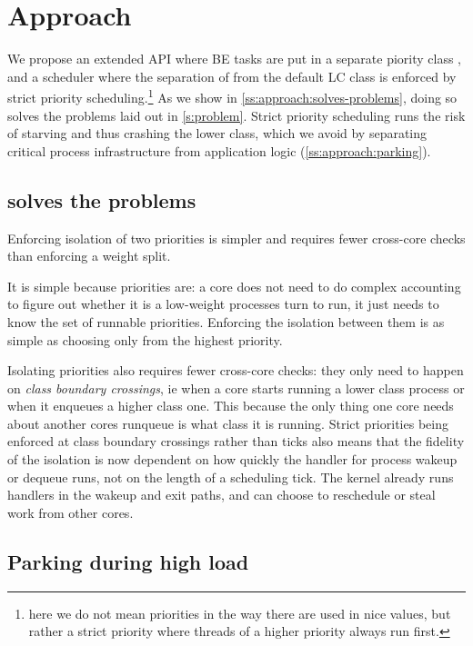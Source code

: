\section{Approach}\label{s:approach}

We propose an extended \cgroups{} API where BE tasks are put in a separate
piority class \beclass{}, and a scheduler where the separation of \beclass{}
from the default LC class is enforced by strict priority
scheduling.\footnote{here we do not mean priorities in the way there are used in
nice values, but rather a strict priority where threads of a higher priority
always run first.} As we show in \autoref{ss:approach:solves-problems}, doing so
solves the problems laid out in \autoref{s:problem}. Strict priority scheduling
runs the risk of starving and thus crashing the lower class, which we avoid by
separating critical process infrastructure from application logic
(\autoref{ss:approach:parking}).

\subsection{\beclass{} solves the problems}\label{ss:approach:solves-problems}

Enforcing isolation of two priorities is simpler and requires fewer cross-core
checks than enforcing a weight split. 

It is simple because priorities are: a core does not need to do complex
accounting to figure out whether it is a low-weight processes turn to run, it
just needs to know the set of runnable priorities. Enforcing the isolation
between them is as simple as choosing only from the highest priority.

Isolating priorities also requires fewer cross-core checks: they only need to
happen on \textit{class boundary crossings}, ie when a core starts running a
lower class process or when it enqueues a higher class one. This because the
only thing one core needs about another cores runqueue is what class it is
running. Strict priorities being enforced at class boundary crossings rather
than ticks also means that the fidelity of the isolation is now dependent on how
quickly the handler for process wakeup or dequeue runs, not on the length of a
scheduling tick. The kernel already runs handlers in the wakeup and exit paths,
and can choose to reschedule or steal work from other cores. 

\subsection{Parking during high load}\label{ss:approach:parking}

